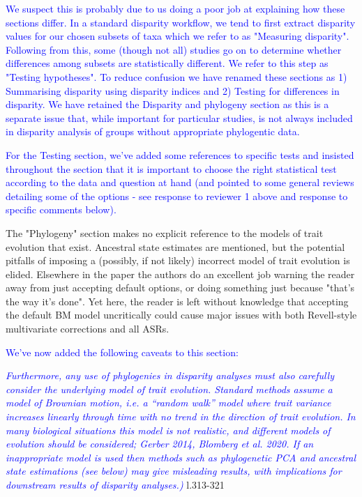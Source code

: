 \documentclass[12pt,letterpaper]{article}
\begin{document}
\textcolor{blue}{We suspect this is probably due to us doing a poor job at explaining how these sections differ. In a standard disparity workflow, we tend to first extract disparity values for our chosen subsets of taxa which we refer to as "Measuring disparity". Following from this, some (though not all) studies go on to determine whether differences among subsets are statistically different. We refer to this step as "Testing hypotheses". To reduce confusion we have renamed these sections as 1) Summarising disparity using disparity indices and 2) Testing for differences in disparity. 
We have retained the Disparity and phylogeny section as this is a separate issue that, while important for particular studies, is not always included in disparity analysis of groups without appropriate phylogentic data.}

\textcolor{blue}{For the Testing section, we've added some references to specific tests and insisted throughout the section that it is important to choose the right statistical test according to the data and question at hand (and pointed to some general reviews detailing some of the options - see response to reviewer 1 above and response to specific comments below).}

\noindent The "Phylogeny" section makes no explicit reference to the models of trait evolution that exist. Ancestral state estimates are mentioned, but the potential pitfalls of imposing a (possibly, if not likely) incorrect model of trait evolution is elided. Elsewhere in the paper the authors do an excellent job warning the reader away from just accepting default options, or doing something just because "that's the way it's done". Yet here, the reader is left without knowledge that accepting the default BM model uncritically could cause major issues with both Revell-style multivariate corrections and all ASRs.

\textcolor{blue}{We've now added the following caveats to this section:}

\textcolor{blue}{\textit{Furthermore, any use of phylogenies in disparity analyses must also carefully consider the underlying model of trait evolution. Standard methods assume a model of Brownian motion, i.e. a ``random walk'' model where trait variance increases linearly through time with no trend in the direction of trait evolution. In many biological situations this model is not realistic, and different models of evolution should be considered; Gerber 2014, Blomberg et al. 2020. If an inappropriate model is used then methods such as phylogenetic PCA and ancestral state estimations (see below) may give misleading results, with implications for downstream results of disparity analyses.)}} l.313-321 %
\end{document}
